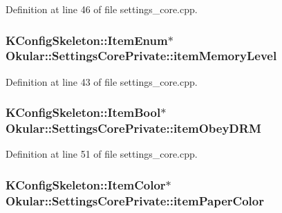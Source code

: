 Definition at line 46 of file settings\+\_\+core.\+cpp.

\hypertarget{classOkular_1_1SettingsCorePrivate_ad06afd9bb29a2031d0b8b59834b8a650}{
\subsubsection[{item\+Memory\+Level}]{\setlength{\rightskip}{0pt plus 5cm}K\+Config\+Skeleton\+::\+Item\+Enum$\ast$ Okular\+::\+Settings\+Core\+Private\+::item\+Memory\+Level}}\label{classOkular_1_1SettingsCorePrivate_ad06afd9bb29a2031d0b8b59834b8a650}


Definition at line 43 of file settings\+\_\+core.\+cpp.

\hypertarget{classOkular_1_1SettingsCorePrivate_a9c750a7d32e4513c0b42b8e2d567fd67}{
\subsubsection[{item\+Obey\+D\+R\+M}]{\setlength{\rightskip}{0pt plus 5cm}K\+Config\+Skeleton\+::\+Item\+Bool$\ast$ Okular\+::\+Settings\+Core\+Private\+::item\+Obey\+D\+R\+M}}\label{classOkular_1_1SettingsCorePrivate_a9c750a7d32e4513c0b42b8e2d567fd67}


Definition at line 51 of file settings\+\_\+core.\+cpp.

\hypertarget{classOkular_1_1SettingsCorePrivate_a7c87e39720150455f90a96214e2cca2b}{
\subsubsection[{item\+Paper\+Color}]{\setlength{\rightskip}{0pt plus 5cm}K\+Config\+Skeleton\+::\+Item\+Color$\ast$ Okular\+::\+Settings\+Core\+Private\+::item\+Paper\+Color}}\label{classOkular_1_1SettingsCorePrivate_a7c87e39720150455f90a96214e2cca2b}


